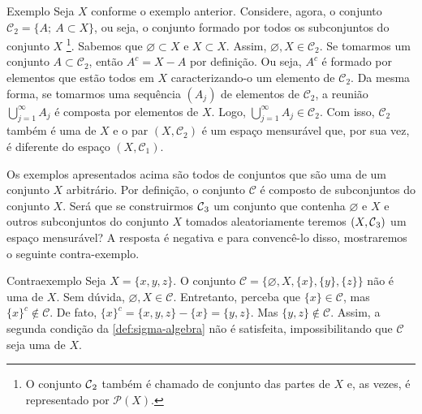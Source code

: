 \begin{env}{Exemplo}
	\label{ex:sigma-subconjuntos}
	Seja $X$ conforme o exemplo anterior.
	Considere, agora, o conjunto \linebreak $\mathcal{C}_2 = \{ A; \ A \subset X\}$, ou seja, o conjunto formado por todos os subconjuntos do conjunto $X$
	\footnote{O conjunto $\operatorname{\mathcal{C}}_2$ também é chamado de conjunto das partes de $X$ e, as vezes, é representado por $\mathcal{P}(X)$.}.
	Sabemos que $\varnothing \subset X$ e $X \subset X$. 
	Assim, $\varnothing, X \in \mathcal{C}_2$. 
	Se tomarmos um conjunto $A \subset \mathcal{C}_2$, então $A^c = X - A$ por definição.
	Ou seja, $A^c$ é formado por elementos que estão todos em $X$ caracterizando-o um elemento de $\mathcal{C}_2$.
	Da mesma forma, se tomarmos uma sequência $(A_j)$ de elementos de $\mathcal{C}_2$, a reunião 
	$\displaystyle \bigcup_{j = 1}^\infty A_j$ é composta por elementos de $X$.
	Logo,  $\displaystyle \bigcup_{j = 1}^\infty A_j \in \mathcal{C}_2$.
	Com isso, $\mathcal{C}_2$ também é uma \sigal de $X$ e o par $(X, \mathcal{C}_2)$ é um espaço mensurável que, por sua vez, é diferente do espaço $(X,\mathcal{C}_1)$.
	\vspace{-0.2cm}
\end{env}

Os exemplos apresentados acima são todos de conjuntos que são uma \sigal de um conjunto $X$ arbitrário.
Por definição, o conjunto $\mathcal{C}$ é composto de subconjuntos do conjunto $X$. 
Será que se construirmos $\operatorname{\mathcal{C}}_3$ um conjunto que contenha $\varnothing$ e $X$ e outros subconjuntos do conjunto $X$ tomados aleatoriamente teremos $(X,\operatorname{\mathcal{C}}_3)$ um espaço mensurável? A resposta é negativa e para convencê-lo disso, mostraremos o seguinte contra-exemplo.

\begin{env}{Contraexemplo}
    Seja $X = \{x,y,z\}$. O conjunto $\mathcal{C} = \{\varnothing, X, \{x\}, \{y\}, \{z\}\}$ não é uma \sigal de $X$.
    Sem dúvida, $\varnothing, X \in \mathcal{C}$. 
    Entretanto, perceba que $\{x\} \in \mathcal{C}$, mas $\{x\}^c \notin \mathcal{C}$.
    De fato, 
    $
    \{x\}^c
    =\{x,y,z\} 
    -\{x\} 
    = \{y,z\}.
    $
    Mas $\{y,z\} \notin \mathcal{C}$.
    Assim, a segunda condição da \ref{def:sigma-algebra} não é satisfeita, impossibilitando que $\mathcal{C}$ seja uma \sigal de $X$.
    \vspace{-0.2cm}
\end{env}

